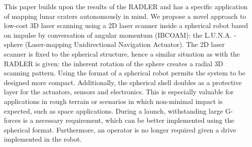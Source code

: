 This paper builds upon the results of the RADLER and has a specific application of mapping lunar craters autonomously in mind.
We propose a novel approach to low-cost 3D laser scanning using a 2D laser scanner inside a spherical robot based on impulse by conversation of angular momentum (IBCOAM): the L.U.N.A. - sphere (Laser-mapping Unidirectional Navigation Actuator).
The 2D laser scanner is fixed to the spherical structure, hence a similar situation as with the RADLER is given: the inherent rotation of the sphere creates a radial 3D scanning pattern.
Using the format of a spherical robot permits the system to be designed more compact. 
Additionally, the spherical shell doubles as a protective layer for the actuators, sensors and electronics. 
This is especially valuable for applications in rough terrain or scenarios in which non-minimal impact is expected, such as space applications.
During a launch, withstanding large G-forces is a necessary requirement, which can be better implemented using the spherical format. 
Furthermore, an operator is no longer required given a drive implemented in the robot.

